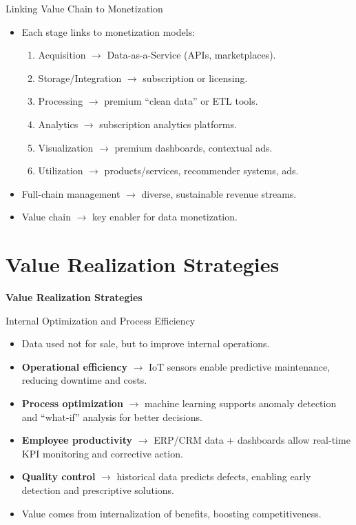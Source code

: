 \documentclass[aspectratio=169, table]{beamer}
\begin{document}
\begin{frame}{Linking Value Chain to Monetization}
	\vspace{15pt}
	\begin{itemize}
		\item Each stage links to monetization models:  
		\begin{enumerate}
			\item Acquisition $\rightarrow$ Data-as-a-Service (APIs, marketplaces).  
			\item Storage/Integration $\rightarrow$ subscription or licensing.  
			\item Processing $\rightarrow$ premium “clean data” or ETL tools.  
			\item Analytics $\rightarrow$ subscription analytics platforms.  
			\item Visualization $\rightarrow$ premium dashboards, contextual ads.  
			\item Utilization $\rightarrow$ products/services, recommender systems, ads.  
		\end{enumerate}
		\item Full-chain management $\rightarrow$ diverse, sustainable revenue streams.  
		\item Value chain $\rightarrow$ key enabler for data monetization.  
	\end{itemize}
\end{frame}

\section{Value Realization Strategies}

\begin{frame}{\hfill}
	\centering
	\Huge{\textbf{Value Realization Strategies}}
\end{frame}

\begin{frame}{Internal Optimization and Process Efficiency}
	\vspace{15pt}
	\begin{itemize}
		\item Data used not for sale, but to improve internal operations.  
		\item \textbf{Operational efficiency} $\rightarrow$ IoT sensors enable predictive maintenance, reducing downtime and costs.  
		\item \textbf{Process optimization} $\rightarrow$ machine learning supports anomaly detection and “what-if” analysis for better decisions.  
		\item \textbf{Employee productivity} $\rightarrow$ ERP/CRM data + dashboards allow real-time KPI monitoring and corrective action.  
		\item \textbf{Quality control} $\rightarrow$ historical data predicts defects, enabling early detection and prescriptive solutions.  
		\item Value comes from internalization of benefits, boosting competitiveness.  
	\end{itemize}
\end{frame}
\end{document}
